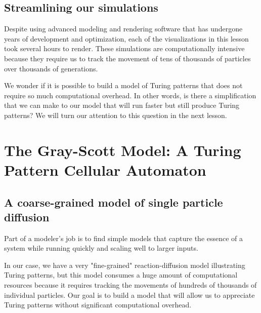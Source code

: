{\FloatBarrier
{}
\subsection{Streamlining our simulations}

Despite using advanced modeling and rendering software that has undergone years of development and optimization, each of the visualizations in this lesson took several hours to render. These simulations are computationally intensive because they require us to track the movement of tens of thousands of particles over thousands of generations.

We wonder if it is possible to build a model of Turing patterns that does not require so much computational overhead. In other words, is there a simplification that we can make to our model that will run faster but still produce Turing patterns? We will turn our attention to this question in the next lesson.





















\FloatBarrier
{}

\section{The Gray-Scott Model: A Turing Pattern Cellular Automaton}
\label{sec:the_gray-scott_model:_a_turing_pattern_cellular_automaton}

\subsection{A coarse-grained model of single particle diffusion}


Part of a modeler's job is to find simple models that capture the essence of a system while running quickly and scaling well to larger inputs.

In our case, we have a very "fine-grained" reaction-diffusion model illustrating Turing patterns, but this model consumes a huge amount of computational resources because it requires tracking the movements of hundreds of thousands of individual particles. Our goal is to build a model that will allow us to appreciate Turing patterns without significant computational overhead.

}
